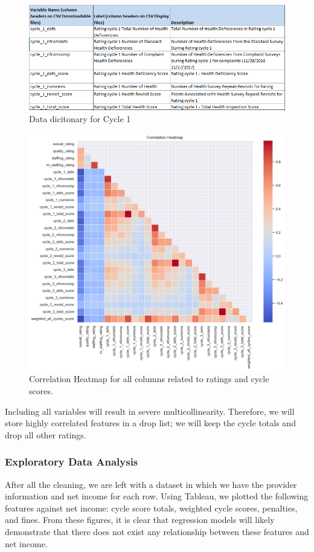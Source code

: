 \documentclass{article}
\theoremstyle{mytheoremstyle}
\theoremstyle{mytheoremstyle}
\theoremstyle{myproblemstyle}
\begin{document}
\begin{figure}[htbp]
\centering
\includegraphics[width=0.8\linewidth]{Images/multicolin.png}
\caption{Data dicitonary for Cycle 1}
\label{fig:Standard Scaler Results}
\end{figure}

\pagebreak
\begin{figure}[htbp]
\centering
\includegraphics[width=0.8\linewidth]{Images/multicolinheat.png}
\caption{Correlation Heatmap for all columns related to ratings and cycle scores.}
\label{fig:Standard Scaler Results}
\end{figure}

Including all variables will result in severe multicollinearity. Therefore, we will store highly correlated features in a drop list; we will keep the cycle totals and drop all other ratings.

\subsubsection{Exploratory Data Analysis}
After all the cleaning, we are left with a dataset in which we have the provider information and net income for each row. Using Tableau, we plotted the following features against net income: cycle score totals, weighted cycle scores, penalties, and fines. From these figures, it is clear that regression models will likely demonstrate that there does not exist any relationship between these features and net income.
\end{document}
